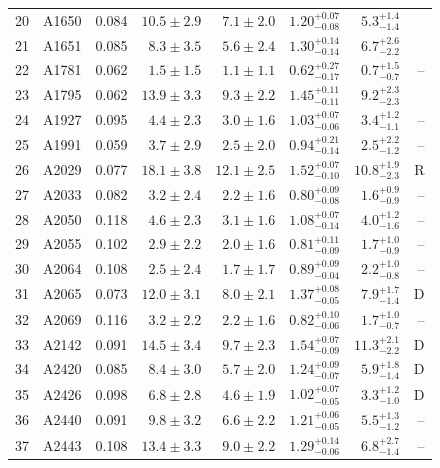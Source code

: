 \documentclass[useAMS,usenatbib]{mnras}
\begin{document}
\begin{table}
\begin{tabularx}{1.0\textwidth}{ l l r r r r r r}
20 & A1650 & 0.084 & $10.5 \pm 2.9$ & $7.1 \pm 2.0$ & $1.20_{-0.08}^{+0.07}$ & $5.3_{-1.4}^{+1.4}$ &  \\
21 & A1651 & 0.085 & $8.3 \pm 3.5$ & $5.6 \pm 2.4$ & $1.30_{-0.14}^{+0.14}$ & $6.7_{-2.2}^{+2.6}$ &  \\
22 & A1781 & 0.062 & $1.5 \pm 1.5$ & $1.1 \pm 1.1$ & $0.62_{-0.17}^{+0.27}$ & $0.7_{-0.7}^{+1.5}$ & -- \\
23 & A1795 & 0.062 & $13.9 \pm 3.3$ & $9.3 \pm 2.2$ & $1.45_{-0.11}^{+0.11}$ & $9.2_{-2.3}^{+2.3}$ &  \\
24 & A1927 & 0.095 & $4.4 \pm 2.3$ & $3.0 \pm 1.6$ & $1.03_{-0.06}^{+0.07}$ & $3.4_{-1.1}^{+1.2}$ & -- \\
25 & A1991 & 0.059 & $3.7 \pm 2.9$ & $2.5 \pm 2.0$ & $0.94_{-0.14}^{+0.21}$ & $2.5_{-1.2}^{+2.2}$ & -- \\
26 & A2029 & 0.077 & $18.1 \pm 3.8$ & $12.1 \pm 2.5$ & $1.52_{-0.10}^{+0.07}$ & $10.8_{-2.3}^{+1.9}$ & R \\
27 & A2033 & 0.082 & $3.2 \pm 2.4$ & $2.2 \pm 1.6$ & $0.80_{-0.08}^{+0.09}$ & $1.6_{-0.9}^{+0.9}$ & -- \\
28 & A2050 & 0.118 & $4.6 \pm 2.3$ & $3.1 \pm 1.6$ & $1.08_{-0.14}^{+0.07}$ & $4.0_{-1.6}^{+1.2}$ & -- \\
29 & A2055 & 0.102 & $2.9 \pm 2.2$ & $2.0 \pm 1.6$ & $0.81_{-0.09}^{+0.11}$ & $1.7_{-0.9}^{+1.0}$ & -- \\
30 & A2064 & 0.108 & $2.5 \pm 2.4$ & $1.7 \pm 1.7$ & $0.89_{-0.04}^{+0.09}$ & $2.2_{-0.8}^{+1.0}$ & -- \\
31 & A2065 & 0.073 & $12.0 \pm 3.1$ & $8.0 \pm 2.1$ & $1.37_{-0.05}^{+0.08}$ & $7.9_{-1.4}^{+1.7}$ & D \\
32 & A2069 & 0.116 & $3.2 \pm 2.2$ & $2.2 \pm 1.6$ & $0.82_{-0.06}^{+0.10}$ & $1.7_{-0.7}^{+1.0}$ & -- \\
33 & A2142 & 0.091 & $14.5 \pm 3.4$ & $9.7 \pm 2.3$ & $1.54_{-0.09}^{+0.07}$ & $11.3_{-2.2}^{+2.1}$ & D \\
34 & A2420 & 0.085 & $8.4 \pm 3.0$ & $5.7 \pm 2.0$ & $1.24_{-0.07}^{+0.09}$ & $5.9_{-1.4}^{+1.8}$ & D \\
35 & A2426 & 0.098 & $6.8 \pm 2.8$ & $4.6 \pm 1.9$ & $1.02_{-0.05}^{+0.07}$ & $3.3_{-1.0}^{+1.2}$ & D \\
36 & A2440 & 0.091 & $9.8 \pm 3.2$ & $6.6 \pm 2.2$ & $1.21_{-0.05}^{+0.06}$ & $5.5_{-1.2}^{+1.3}$ & -- \\
37 & A2443 & 0.108 & $13.4 \pm 3.3$ & $9.0 \pm 2.2$ & $1.29_{-0.06}^{+0.14}$ & $6.8_{-1.4}^{+2.7}$ & -- \\

\end{tabularx}
\end{table}
\end{document}
